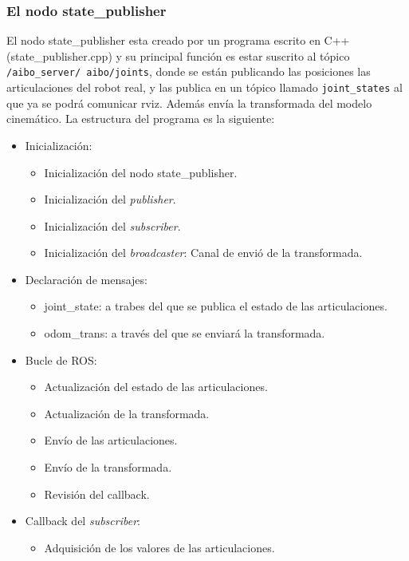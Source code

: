 \documentclass[12pt,a4paper,final,twoside]{book}
\begin{document}
\subsubsection{El nodo state{\_}publisher}\label{nodoSP}
El nodo state{\_}publisher esta creado por un programa escrito en C++ (state{\_}publisher.cpp) y su principal función es estar suscrito al tópico \texttt{/aibo{\_}server/ aibo/joints}, donde se están publicando las posiciones las articulaciones del robot real, y las publica en un tópico llamado \texttt{joint{\_}states} al que ya se podrá comunicar rviz. Además envía la transformada del modelo cinemático.
La estructura del programa es la siguiente:
\begin{itemize}
\item Inicialización:
\begin{itemize}
\item Inicialización del nodo state{\_}publisher.
\item Inicialización del \textit{publisher}.
\item Inicialización del \textit{subscriber}.
\item Inicialización del \textit{broadcaster}: Canal de envió de la transformada. 
\end{itemize}
\item Declaración de mensajes:
\begin{itemize}
\item joint{\_}state: a trabes del que se publica el estado de las articulaciones.
\item odom{\_}trans: a través del que se enviará la transformada.
\end{itemize}
\item Bucle de ROS:
\begin{itemize}
\item Actualización del estado de las articulaciones.
\item Actualización de la transformada.
\item Envío de las articulaciones.
\item Envío de la transformada.
\item Revisión del callback. 
\end{itemize}
\item Callback del \textit{subscriber}:
\begin{itemize}
\item Adquisición de los valores de las articulaciones.
\end{itemize}
\end{itemize}
\end{document}
